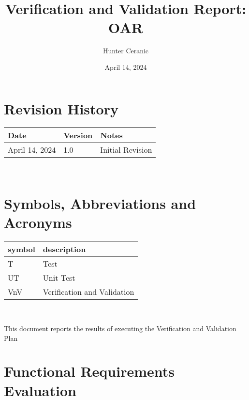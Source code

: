 \documentclass[12pt, titlepage]{article}
\begin{document}
\title{Verification and Validation Report: OAR} 
\author{Hunter Ceranic}
\date{April 14, 2024}
	
\maketitle


\section{Revision History}

\begin{tabularx}{\textwidth}{p{3cm}p{2cm}X}
\toprule {\bf Date} & {\bf Version} & {\bf Notes}\\
\midrule
April 14, 2024 & 1.0 & Initial Revision\\
\bottomrule
\end{tabularx}

~\newpage

\section{Symbols, Abbreviations and Acronyms}

\renewcommand{\arraystretch}{1.2}
\begin{tabular}{l l} 
  \toprule		
  \textbf{symbol} & \textbf{description}\\
  \midrule 
  T & Test\\
  UT & Unit Test\\
  VnV& Verification and Validation\\
  \bottomrule
\end{tabular}\\

\newpage

\tableofcontents

\newpage


This document reports the results of executing the Verification and Validation Plan \cite{VnV_plan}

\section{Functional Requirements Evaluation}
\end{document}
